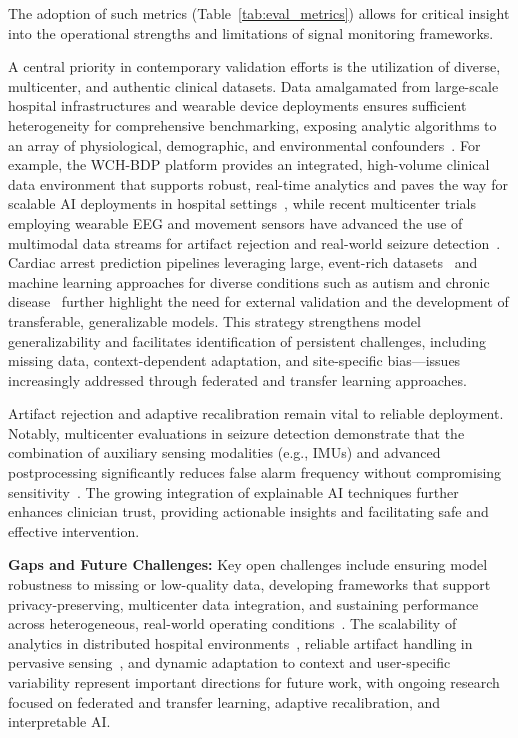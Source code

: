 \documentclass[sigconf]{acmart}
\begin{document}
The adoption of such metrics (Table~\ref{tab:eval_metrics}) allows for critical insight into the operational strengths and limitations of signal monitoring frameworks.

A central priority in contemporary validation efforts is the utilization of diverse, multicenter, and authentic clinical datasets. Data amalgamated from large-scale hospital infrastructures and wearable device deployments ensures sufficient heterogeneity for comprehensive benchmarking, exposing analytic algorithms to an array of physiological, demographic, and environmental confounders~\cite{ref77,ref80,ref84,ref89,ref90,ref103,ref107}. For example, the WCH-BDP platform provides an integrated, high-volume clinical data environment that supports robust, real-time analytics and paves the way for scalable AI deployments in hospital settings~\cite{ref84}, while recent multicenter trials employing wearable EEG and movement sensors have advanced the use of multimodal data streams for artifact rejection and real-world seizure detection~\cite{ref103}. Cardiac arrest prediction pipelines leveraging large, event-rich datasets~\cite{ref80} and machine learning approaches for diverse conditions such as autism and chronic disease~\cite{ref89,ref90} further highlight the need for external validation and the development of transferable, generalizable models. This strategy strengthens model generalizability and facilitates identification of persistent challenges, including missing data, context-dependent adaptation, and site-specific bias—issues increasingly addressed through federated and transfer learning approaches.

Artifact rejection and adaptive recalibration remain vital to reliable deployment. Notably, multicenter evaluations in seizure detection demonstrate that the combination of auxiliary sensing modalities (e.g., IMUs) and advanced postprocessing significantly reduces false alarm frequency without compromising sensitivity~\cite{ref103}. The growing integration of explainable AI techniques further enhances clinician trust, providing actionable insights and facilitating safe and effective intervention.

\textbf{Gaps and Future Challenges:} Key open challenges include ensuring model robustness to missing or low-quality data, developing frameworks that support privacy-preserving, multicenter data integration, and sustaining performance across heterogeneous, real-world operating conditions~\cite{ref84,ref90}. The scalability of analytics in distributed hospital environments~\cite{ref84}, reliable artifact handling in pervasive sensing~\cite{ref103}, and dynamic adaptation to context and user-specific variability represent important directions for future work, with ongoing research focused on federated and transfer learning, adaptive recalibration, and interpretable AI.
\end{document}
